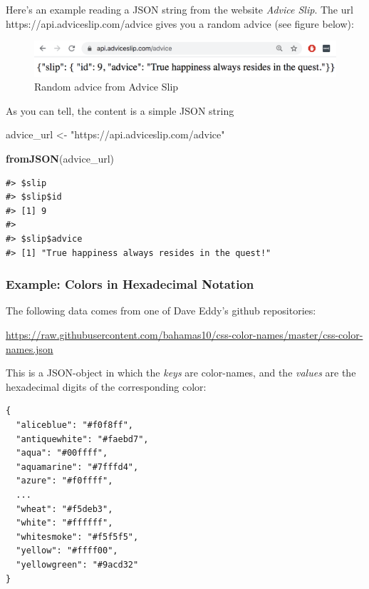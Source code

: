 \documentclass[
]{book}
\newenvironment{Shaded}{\begin{snugshade}}{\end{snugshade}}
\newcommand{\FunctionTok}[1]{\textcolor[rgb]{0.13,0.29,0.53}{\textbf{#1}}}
\newcommand{\NormalTok}[1]{#1}
\newcommand{\OtherTok}[1]{\textcolor[rgb]{0.56,0.35,0.01}{#1}}
\newcommand{\StringTok}[1]{\textcolor[rgb]{0.31,0.60,0.02}{#1}}
\begin{document}
Here's an example reading a JSON string from the website \emph{Advice Slip}.
The url https://api.adviceslip.com/advice
gives you a random advice (see figure below):

\begin{figure}

{\centering \includegraphics[width=0.8\linewidth]{images/api/advice-slip-happiness} 

}

\caption{Random advice from Advice Slip}\label{fig:unnamed-chunk-104}
\end{figure}

As you can tell, the content is a simple JSON string

\begin{Shaded}
\begin{Highlighting}[]
\NormalTok{advice\_url }\OtherTok{\textless{}{-}} \StringTok{"https://api.adviceslip.com/advice"}

\FunctionTok{fromJSON}\NormalTok{(advice\_url)}
\end{Highlighting}
\end{Shaded}

\begin{verbatim}
#> $slip
#> $slip$id
#> [1] 9
#> 
#> $slip$advice
#> [1] "True happiness always resides in the quest!"
\end{verbatim}

\hypertarget{example-colors-in-hexadecimal-notation}{%
\subsubsection*{Example: Colors in Hexadecimal Notation}\label{example-colors-in-hexadecimal-notation}}

The following data comes from one of Dave Eddy's github repositories:

\url{https://raw.githubusercontent.com/bahamas10/css-color-names/master/css-color-names.json}

This is a JSON-object in which the \emph{keys} are color-names, and the \emph{values} are
the hexadecimal digits of the corresponding color:

\begin{verbatim}
{
  "aliceblue": "#f0f8ff",
  "antiquewhite": "#faebd7",
  "aqua": "#00ffff",
  "aquamarine": "#7fffd4",
  "azure": "#f0ffff",
  ...
  "wheat": "#f5deb3",
  "white": "#ffffff",
  "whitesmoke": "#f5f5f5",
  "yellow": "#ffff00",
  "yellowgreen": "#9acd32"
}
\end{verbatim}
\end{document}
